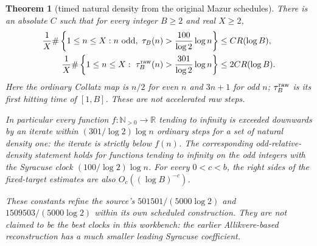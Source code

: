 \documentclass[11pt]{article}
\newtheorem{theorem}[proposition]{Theorem}
\theoremstyle{remark}\newtheorem{remark}[proposition]{Remark}
\begin{document}
\begin{theorem}[timed natural density from the original Mazur schedules]
\label{thm:mazur-critical-density}
There is an absolute \(C\) such that for every integer \(B\ge2\) and
real \(X\ge2\),
\begin{align}
 \frac1X\#\left\{1\le n\le X:n\text{ odd},\
       \tau_B(n)>\frac{100}{\log2}\log n\right\}
 &\le C R(\log B),\label{eq:mazur-odd-density}\\
 \frac1X\#\left\{1\le n\le X:\
       \tau_B^{\rm raw}(n)>\frac{301}{\log2}\log n\right\}
 &\le 2C R(\log B).\label{eq:mazur-raw-density}
\end{align}
Here the ordinary Collatz map is \(n/2\) for even \(n\) and
\(3n+1\) for odd \(n\); \(\tau_B^{\rm raw}\) is its first hitting
time of \([1,B]\). These are not accelerated raw steps.

In particular every function \(f:\mathbb N_{>0}\to\mathbb R\)
tending to infinity is exceeded downwards by an iterate within
\((301/\log2)\log n\) ordinary steps for a set of natural density one:
the iterate is \emph{strictly} below \(f(n)\).
The corresponding odd-relative-density statement holds for functions
tending to infinity on the odd integers with the Syracuse clock
\((100/\log2)\log n\). For every \(0<c<b\), the right sides of the
fixed-target estimates are also \(O_c((\log B)^{-c})\).

These constants refine the source's
\(501501/(5000\log2)\) and \(1509503/(5000\log2)\)
within its own scheduled construction. They are not claimed to be
the best clocks in this workbench: the earlier Allikvere-based
reconstruction has a much smaller leading Syracuse coefficient.
\end{theorem}
\end{document}

